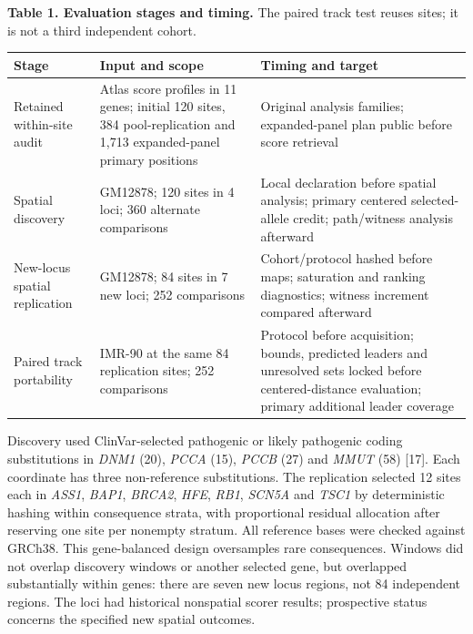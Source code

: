 \documentclass[
  11pt,
]{article}
\newcounter{none} %
\begin{document}
\textbf{Table 1. Evaluation stages and timing.} The paired track test
reuses sites; it is not a third independent cohort.

{\def\LTcaptype{none} %
\begin{longtable}[]{@{}
  >{\raggedright\arraybackslash}p{}
  >{\raggedright\arraybackslash}p{}
  >{\raggedright\arraybackslash}p{}@{}}
\toprule\noalign{}
\begin{minipage}[b]{\linewidth}\raggedright
Stage
\end{minipage} & \begin{minipage}[b]{\linewidth}\raggedright
Input and scope
\end{minipage} & \begin{minipage}[b]{\linewidth}\raggedright
Timing and target
\end{minipage} \\
\midrule\noalign{}
\endhead
\bottomrule\noalign{}
\endlastfoot
Retained within-site audit & Atlas score profiles in 11 genes; initial
120 sites, 384 pool-replication and 1,713 expanded-panel primary
positions & Original analysis families; expanded-panel plan public
before score retrieval \\
Spatial discovery & GM12878; 120 sites in 4 loci; 360 alternate
comparisons & Local declaration before spatial analysis; primary
centered selected-allele credit; path/witness analysis afterward \\
New-locus spatial replication & GM12878; 84 sites in 7 new loci; 252
comparisons & Cohort/protocol hashed before maps; saturation and ranking
diagnostics; witness increment compared afterward \\
Paired track portability & IMR-90 at the same 84 replication sites; 252
comparisons & Protocol before acquisition; bounds, predicted leaders and
unresolved sets locked before centered-distance evaluation; primary
additional leader coverage \\
\end{longtable}
}

Discovery used ClinVar-selected pathogenic or likely pathogenic coding
substitutions in \emph{DNM1} (20), \emph{PCCA} (15), \emph{PCCB} (27)
and \emph{MMUT} (58) {[}17{]}. Each coordinate has three non-reference
substitutions. The replication selected 12 sites each in \emph{ASS1},
\emph{BAP1}, \emph{BRCA2}, \emph{HFE}, \emph{RB1}, \emph{SCN5A} and
\emph{TSC1} by deterministic hashing within consequence strata, with
proportional residual allocation after reserving one site per nonempty
stratum. All reference bases were checked against GRCh38. This
gene-balanced design oversamples rare consequences. Windows did not
overlap discovery windows or another selected gene, but overlapped
substantially within genes: there are seven new locus regions, not 84
independent regions. The loci had historical nonspatial scorer results;
prospective status concerns the specified new spatial outcomes.
\end{document}
